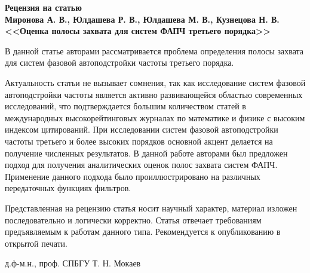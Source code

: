 \documentclass[a4paper,article,14pt]{extarticle}
\begin{document}
\begin{singlespace}
  {\small
    \begin{center}
      \begin{minipage}{0.8\textwidth}
        \begin{center}
          {\normalsize \textbf{Рецензия  на статью}}\\[0.2cm]
          \textbf{Миронова А. В., Юлдашева Р. В., Юлдашева М. В., Кузнецова Н. В. <<Оценка полосы захвата для систем ФАПЧ
третьего порядка>>}
        
        \end{center}
      \end{minipage}
    \end{center}

   В данной статье авторами рассматривается проблема определения полосы захвата для систем фазовой автоподстройки частоты третьего порядка.

   Актуальность статьи не вызывает сомнения, так как исследование систем фазовой автоподстройки частоты является активно развивающейся областью современных исследований, что подтверждается большим количеством статей в международных высокорейтинговых журналах по математике и физике с высоким индексом цитирований. При исследовании систем фазовой автоподстройки частоты третьего и более высоких порядков основной акцент делается на получение численных результатов. В данной работе авторами был предложен подход для получения аналитических оценок полос захвата систем ФАПЧ. Применение данного подхода было проиллюстрировано на различных передаточных функциях фильтров.

    Представленная на рецензию статья носит научный характер, материал изложен последовательно и логически корректно. Статья отвечает требованиям предъявляемым к работам данного типа. Рекомендуется к опубликованию в открытой печати.

    \vspace{0.2cm}
    \noindent
      \begin{flushright}
      д.ф-м.н., проф. СПБГУ Т. Н. Мокаев
      \end{flushright}
  }
\end{singlespace}
\thispagestyle{empty}
\end{document}

